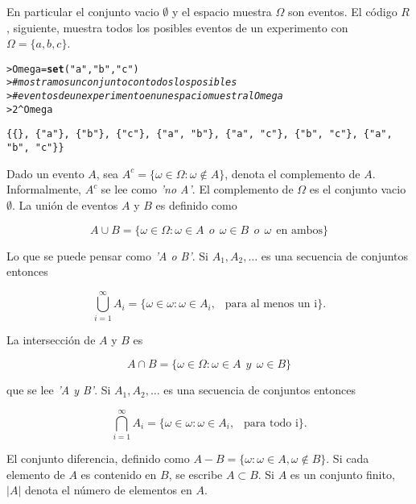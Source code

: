 \documentclass{article}\usepackage[]{graphicx}\usepackage[]{color}
\makeatletter
\newcommand{\hlnum}[1]{\textcolor[rgb]{0.686,0.059,0.569}{#1}}%
\newcommand{\hlstr}[1]{\textcolor[rgb]{0.192,0.494,0.8}{#1}}%
\newcommand{\hlcom}[1]{\textcolor[rgb]{0.678,0.584,0.686}{\textit{#1}}}%
\newcommand{\hlopt}[1]{\textcolor[rgb]{0,0,0}{#1}}%
\newcommand{\hlstd}[1]{\textcolor[rgb]{0.345,0.345,0.345}{#1}}%
\newcommand{\hlkwb}[1]{\textcolor[rgb]{0.69,0.353,0.396}{#1}}%
\newcommand{\hlkwd}[1]{\textcolor[rgb]{0.737,0.353,0.396}{\textbf{#1}}}%
\newenvironment{kframe}{%
 \def\at@end@of@kframe{}%
 \ifinner\ifhmode%
  \def\at@end@of@kframe{\end{minipage}}%
  \begin{minipage}{\columnwidth}%
 \fi\fi%
 \def\FrameCommand##1{\hskip\@totalleftmargin \hskip-\fboxsep
 \colorbox{shadecolor}{##1}\hskip-\fboxsep
     \hskip-\linewidth \hskip-\@totalleftmargin \hskip\columnwidth}%
 \MakeFramed {\advance\hsize-\width
   \@totalleftmargin\z@ \linewidth\hsize
   \@setminipage}}%
 {\par\unskip\endMakeFramed%
 \at@end@of@kframe}
\newenvironment{knitrout}{}{} %
\makeatother
\begin{document}
En particular el conjunto vacio $\emptyset$ y el espacio muestra $\Omega$ son eventos. El c\'odigo $R$, siguiente, muestra todos los posibles eventos de un experimento con $\Omega = \{ a,b, c \}$.
\begin{knitrout}
\color{fgcolor}\begin{kframe}
\begin{alltt}
\hlstd{> }\hlstd{Omega}  \hlkwb{=} \hlkwd{set}\hlstd{(}\hlstr{"a"}\hlstd{,} \hlstr{"b"}\hlstd{,} \hlstr{"c"}\hlstd{)}
\hlstd{> }\hlcom{# mostramos un conjunto con todos los posibles}
\hlstd{> }\hlcom{# eventos de un experimento  en un espacio muestral Omega}
\hlstd{> }\hlnum{2}\hlopt{^}\hlstd{Omega}
\end{alltt}
\begin{verbatim}
{{}, {"a"}, {"b"}, {"c"}, {"a", "b"}, {"a", "c"}, {"b", "c"}, {"a", "b", "c"}}
\end{verbatim}
\end{kframe}
\end{knitrout}

\vspace{0.3cm}

Dado un evento $A$, sea $A^{c} = \{ \omega \in \Omega: \omega \notin A \}$, denota el complemento de $A$. Informalmente, $A^{c}$ se lee como \textit{'no A'}. El complemento de $\Omega$ es el conjunto vacio $\emptyset$. La uni\'on de eventos $A$ y $B$ es definido como

\[
A\cup B= \{ \omega \in \Omega: \omega \in A \ \ o \  \  \omega \in B \ \ o \ \ \omega \ \  \mbox{en ambos} \}
\]

Lo que se puede pensar como \textit{'A o B'}. Si $A_1, A_2, \dots$ es una secuencia de conjuntos entonces

\[
\bigcup\limits_{i= 1}^{\infty}A_i = \{ \omega \in \omega: \omega \in A_i, \ \ \mbox{ para al menos  un i} \}.
\]

\newpage
La intersecci\'on de $A$ y $B$ es 

\[
A\cap B= \{ \omega \in \Omega: \omega \in A \ \ y \  \  \omega \in B  \}
\]

que se lee \textit{'A y B'}. Si $A_1, A_2, \dots$ es una secuencia de conjuntos entonces

\[
\bigcap\limits_{i= 1}^{\infty}A_i = \{ \omega \in \omega: \omega \in A_i, \ \ \mbox{ para todo  i} \}.
\]

El conjunto diferencia, definido como $A -B = \{ \omega: \omega \in A, \omega \notin B  \}$. Si cada elemento de $A$ es contenido  en $B$, se escribe $A \subset B$. Si $A$ es un conjunto finito, $\vert A \vert$ denota el n\'umero de elementos en $A$.
\end{document}
